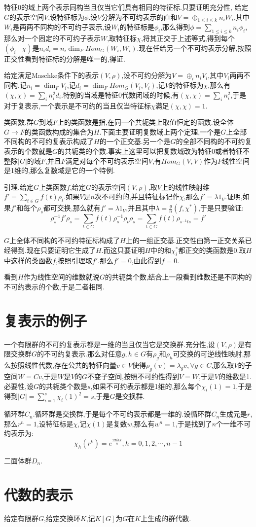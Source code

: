 特征0的域上两个表示同构当且仅当它们具有相同的特征标.只要证明充分性,
给定$G$的表示空间$V$,设特征标为$\phi$.设$V$分解为不可约表示的直和$V=\oplus_{1\le i\le k}n_iW_i$,其中$W_i$是两两不同构的不可约子表示,设$W_i$的特征标是$\phi_i$,那么得到$\phi=\sum_{1\le i\le k}n_i\phi_i$,那么对一个固定的不可约子表示$W$,取特征标$\chi$,将其正交于上述等式,得到每个$(\phi_i\mid\chi)$是$n_id_i=n_i\dim_F Hom_G(W_i,W_i)$.现在任给另一个不可约表示分解,按照正交性看到特征标的分解是唯一的,得证.

给定满足Maschke条件下的表示$(V,\rho)$,设不可约分解为$V=\oplus_in_iV_i$,其中$V_i$两两不同构,记$n_i=\dim_FV_i$,记$d_i=\dim_FHom_G(V_i,V_i)$,记$V$的特征标为$\chi$,那么有$(\chi,\chi)=\sum_in_i^2d_i$.特别的当域是特征0代数闭域的时候,有$(\chi,\chi)=\sum_in_i^2$,于是对于复表示,一个表示是不可约的当且仅当特征标$\chi$满足$(\chi,\chi)=1$.

类函数.群$G$到域$F$上的类函数是指,在同一个共轭类上取值恒定的函数.设全体$G\to F$的类函数构成的集合为$H$.下面主要证明复数域上两个定理,一个是$G$上全部不同构的不可约复表示构成了$H$的一个正交基.另一个是$G$的全部不同构的不可约复表示的个数就是$G$的共轭类的个数.事实上这里可以把复数域改为特征0或者特征不整除$|G|$的域$F$,并且$F$满足对每个不可约表示空间$V$,有$Hom_G(V,V)$作为$F$线性空间是1维的,那么复数域是它的一个特例.

引理.给定$G$上类函数$f$,给定$G$的表示空间$(V,\rho)$,取$V$上的线性映射维$f'=\sum_{t\in G}f(t)\rho_t$.如果$V$是$n$次不可约的,并且特征标记作$\chi$,那么$f'=\lambda 1_V$.证明,如果$f'$和每个$\rho_s$都可交换,那么就有$f'=\lambda 1_V$,并且其中$\lambda=\frac{g}{n}(f,\chi^*)$,于是只要验证:
$$\rho_s^{-1}f'\rho_s=\sum_{t\in G}f(t)\rho_s^{-1}\rho_t\rho_s=
\sum_{t\in G}f(t)\rho_{s^{-1}ts}=f'$$

$G$上全体不同构的不可约特征标构成了$H$上的一组正交基.正交性由第一正交关系已经得到.现在只要证明它生成了$H$.而这只要证明$H$中的和$\chi_i^*$都正交的类函数是0.取$H$中这样的类函数$f$,按照引理取$f'$.那么$f'=0$,由此得到$f=0$.

看到$H$作为线性空间的维数就说$G$的共轭类个数,结合上一段看到维数还是不同构的不可约表示的个数,于是二者相同.

\section{复表示的例子}

一个有限群的不可约复表示都是一维的当且仅当它是交换群.充分性,设$(V,\rho)$是有限交换群$G$的不可约复表示.那么对任意$g,h\in G$有$\rho_g$和$\rho_h$可交换的可逆线性映射,那么按照线性代数,存在公共的特征向量$v\in V$使得$\rho_g(v)=\lambda_gv,\forall g\in C$,那么取$V$的子空间$W=Cv$,于是$W$是$V$的$G$不变子空间,按照不可约性得到$V=W$,于是$V$的维数是1.必要性,设$G$的共轭类个数是$s$,如果不可约表示都是1维的,那么每个$\chi_i(1)=1$,于是得到$|G|=\sum_{i=1}^{s}\chi_i(1)^2=s$,于是$G$是交换群.

循环群$C_n$.循环群是交换群,于是每个不可约表示都是一维的.设循环群$C_n$生成元是$r$,那么$r^n=1$,设特征标是$\chi$,记$\chi(1)$是复数$w$,那么有$w^n=1$,于是找到了$n$个一维不可约表示为:
$$\chi_h(r^k)=e^{\frac{2\pi ihk}{n}},h=0,1,2,\cdots,n-1$$

二面体群$D_n$.

\section{代数的表示}

给定有限群$G$,给定交换环$K$,记$K[G]$为$G$在$K$上生成的群代数.